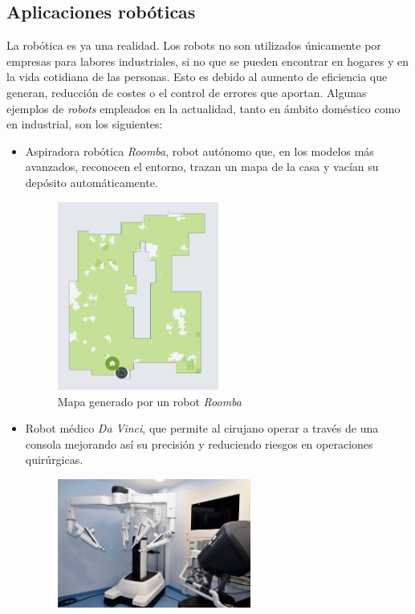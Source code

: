\subsection{Aplicaciones robóticas}

La robótica es ya una realidad. Los robots no son utilizados únicamente por empresas para labores industriales, si no que se pueden encontrar en hogares y en la vida cotidiana de las personas. Esto es debido al aumento de eficiencia que generan, reducción de costes o el control de errores que aportan.  Algunas ejemplos de \textit{robots} empleados en la actualidad, tanto en ámbito doméstico como en industrial, son los siguientes: 
\begin{itemize}
    \item Aspiradora robótica \textit{Roomba}, robot autónomo que, en los modelos más avanzados, reconocen el entorno, trazan un mapa de la casa y vacían su depósito automáticamente.
    \begin{figure}[H]
\centering
\includegraphics[width=0.5\textwidth]{img/roomba.png}
\caption{Mapa generado por un robot \textit{Roomba}} \label{fig:roomba}
\end{figure}
    \item Robot médico \textit{Da Vinci}, que permite al cirujano operar a través de una consola mejorando así su precisión y reduciendo riesgos en operaciones quirúrgicas. 
      \begin{figure}[H]
    \centering
    \includegraphics[width=0.6\textwidth]{img/davinci.jpg}

\end{figure}
\end{itemize}
